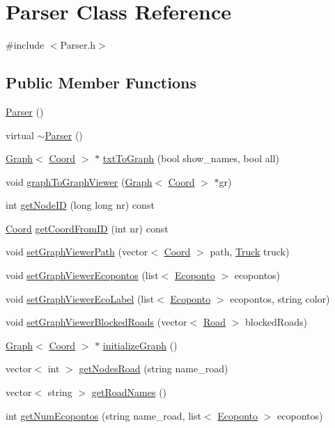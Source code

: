 \hypertarget{class_parser}{}\section{Parser Class Reference}
\label{class_parser}


{\ttfamily \#include $<$Parser.\+h$>$}

\subsection*{Public Member Functions}
\begin{DoxyCompactItemize}
\item 
\hyperlink{class_parser_a12234f6cd36b61af4b50c94a179422c1}{Parser} ()
\item 
virtual \hyperlink{class_parser_a3e658b5917a93a3ef648050d060e3a93}{$\sim$\+Parser} ()
\item 
\hyperlink{class_graph}{Graph}$<$ \hyperlink{class_coord}{Coord} $>$ $\ast$ \hyperlink{class_parser_a27fa2179fa2d1a816c3da22d71737689}{txt\+To\+Graph} (bool show\+\_\+names, bool all)
\item 
void \hyperlink{class_parser_a0d632821b1754d3d5025f33b15688959}{graph\+To\+Graph\+Viewer} (\hyperlink{class_graph}{Graph}$<$ \hyperlink{class_coord}{Coord} $>$ $\ast$gr)
\item 
int \hyperlink{class_parser_a128539cb6183b11ab4578cf576559d9c}{get\+Node\+ID} (long long nr) const 
\item 
\hyperlink{class_coord}{Coord} \hyperlink{class_parser_abd304a038ed913b9b51d9fae752ab21e}{get\+Coord\+From\+ID} (int nr) const 
\item 
void \hyperlink{class_parser_a08cc4de62ebbae19c7aac8f4326da557}{set\+Graph\+Viewer\+Path} (vector$<$ \hyperlink{class_coord}{Coord} $>$ path, \hyperlink{class_truck}{Truck} truck)
\item 
void \hyperlink{class_parser_a47937fbc44ba789ea3c01b92c1154e52}{set\+Graph\+Viewer\+Ecopontos} (list$<$ \hyperlink{class_ecoponto}{Ecoponto} $>$ ecopontos)
\item 
void \hyperlink{class_parser_acaa7464567569320058c42ebde1c7f8f}{set\+Graph\+Viewer\+Eco\+Label} (list$<$ \hyperlink{class_ecoponto}{Ecoponto} $>$ ecopontos, string color)
\item 
void \hyperlink{class_parser_a3b4beea9506e940affb482148db24161}{set\+Graph\+Viewer\+Blocked\+Roads} (vector$<$ \hyperlink{struct_road}{Road} $>$ blocked\+Roads)
\item 
\hyperlink{class_graph}{Graph}$<$ \hyperlink{class_coord}{Coord} $>$ $\ast$ \hyperlink{class_parser_addeff7e0f7adcb63b5494be6221337bf}{initialize\+Graph} ()
\item 
vector$<$ int $>$ \hyperlink{class_parser_a76f17810bccabb30b004a99a70f97f5a}{get\+Nodes\+Road} (string name\+\_\+road)
\item 
vector$<$ string $>$ \hyperlink{class_parser_ab1722589534f74ec9e8b04e9f9152591}{get\+Road\+Names} ()
\item 
int \hyperlink{class_parser_a86e4385a72b5c7b962feb68401d6487f}{get\+Num\+Ecopontos} (string name\+\_\+road, list$<$ \hyperlink{class_ecoponto}{Ecoponto} $>$ ecopontos)
\end{DoxyCompactItemize}


